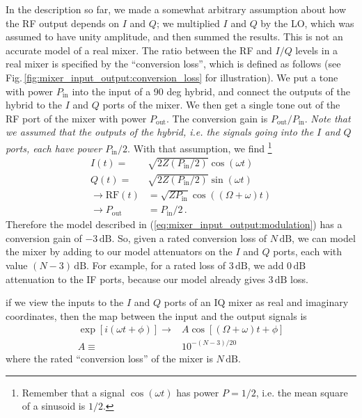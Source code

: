 

In the description so far, we made a somewhat arbitrary assumption about how the RF output depends on $I$ and $Q$; we multiplied $I$ and $Q$ by the LO, which was assumed to have unity amplitude, and then summed the results.
This is not an accurate model of a real mixer.
The ratio between the RF and $I/Q$ levels in a real mixer is specified by the ``conversion loss'', which is defined as follows (see Fig.\,\ref{fig:mixer_input_output:conversion_loss} for illustration).
We put a tone with power $P_\text{in}$ into the input of a 90 deg hybrid, and connect the outputs of the hybrid to the $I$ and $Q$ ports of the mixer.
We then get a single tone out of the RF port of the mixer with power $P_\text{out}$.
The conversion gain is $P_\text{out}/P_\text{in}$.
\emph{Note that we assumed that the outputs of the hybrid, i.e. the signals going into the $I$ and $Q$ ports, each have power $P_\text{in}/2$}.
With that assumption, we find \footnote{Remember that a signal $\cos(\omega t)$ has power $P=1/2$, i.e. the mean square of a sinusoid is $1/2$.}
\begin{align}
I(t) =& \sqrt{2 Z (P_\text{in}/2)} \cos(\omega t) \nonumber \\
Q(t) =& \sqrt{2 Z (P_\text{in}/2)} \sin(\omega t) \nonumber \\
\rightarrow \text{RF}(t) &= \sqrt{Z P_\text{in}} \cos((\Omega + \omega) t) \nonumber \\
\rightarrow P_\text{out} &= P_\text{in} / 2 \, . \nonumber
\end{align}
Therefore the model described in (\ref{eq:mixer_input_output:modulation}) has a conversion gain of $-3\,\text{dB}$.
So, given a rated conversion loss of $N\,\text{dB}$, we can model the mixer by adding to our model attenuators on the $I$ and $Q$ ports, each with value $(N-3) \, \text{dB}$.
For example, for a rated loss of $3\,\text{dB}$, we add $0\, \text{dB}$ attenuation to the IF ports, because our model already gives $3\,\text{dB}$ loss.

if we view the inputs to the $I$ and $Q$ ports of an IQ mixer as real and imaginary coordinates, then the map between the input and the output signals is
\begin{align}
\exp[i(\omega t + \phi)] \rightarrow& A \cos[(\Omega+\omega)t + \phi] \nonumber \\
A \equiv& 10^{-(N - 3)/20}
\end{align}
where the rated ``conversion loss'' of the mixer is $N\,\text{dB}$.

